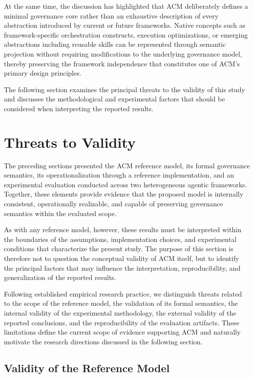\documentclass[10pt]{article}
\begin{document}
At the same time, the discussion has highlighted that ACM deliberately defines a minimal governance core rather than an exhaustive description of every abstraction introduced by current or future frameworks. Native concepts such as framework-specific orchestration constructs, execution optimizations, or emerging abstractions including reusable skills can be represented through semantic projection without requiring modifications to the underlying governance model, thereby preserving the framework independence that constitutes one of ACM's primary design principles.

The following section examines the principal threats to the validity of this study and discusses the methodological and experimental factors that should be considered when interpreting the reported results.

\section{Threats to Validity}
\label{sec:threats_validity}

The preceding sections presented the ACM reference model, its formal governance semantics, its operationalization through a reference implementation, and an experimental evaluation conducted across two heterogeneous agentic frameworks. Together, these elements provide evidence that the proposed model is internally consistent, operationally realizable, and capable of preserving governance semantics within the evaluated scope.

As with any reference model, however, these results must be interpreted within the boundaries of the assumptions, implementation choices, and experimental conditions that characterize the present study. The purpose of this section is therefore not to question the conceptual validity of ACM itself, but to identify the principal factors that may influence the interpretation, reproducibility, and generalization of the reported results.

Following established empirical research practice, we distinguish threats related to the scope of the reference model, the validation of its formal semantics, the internal validity of the experimental methodology, the external validity of the reported conclusions, and the reproducibility of the evaluation artifacts. These limitations define the current scope of evidence supporting ACM and naturally motivate the research directions discussed in the following section.

\subsection{Validity of the Reference Model}
\label{sec:validity_reference_model}
\end{document}

